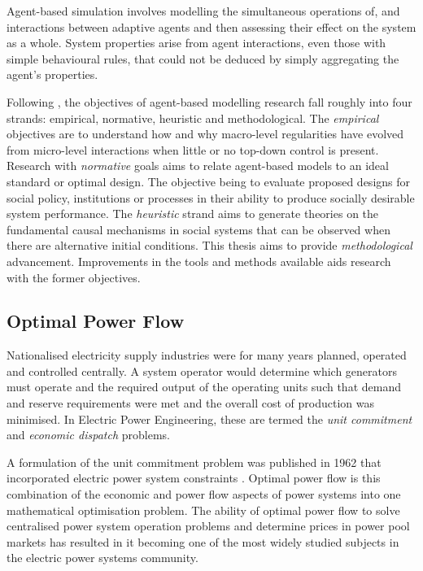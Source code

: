 Agent-based simulation involves modelling the simultaneous operations of, and
interactions between adaptive agents and then assessing their effect on the
system as a whole.  System properties arise from agent interactions, even those
with simple behavioural rules, that could not be deduced by simply aggregating
the agent's properties. %

Following , the objectives of agent-based modelling
research fall roughly into four strands: empirical, normative, heuristic and
methodological. The \textit{empirical} objectives are to understand how and why
macro-level regularities have evolved from micro-level interactions when little
or no top-down control is present.  Research with \textit{normative} goals aims
to relate agent-based models to an ideal standard or optimal design.  The
objective being to evaluate proposed designs for social policy, institutions or
processes in their ability to produce socially desirable system performance. The
\textit{heuristic} strand aims to generate theories on the fundamental causal
mechanisms in social systems that can be observed when there are alternative
initial conditions.  This thesis aims to provide \textit{methodological}
advancement.  Improvements in the tools and methods available aids research with
the former objectives.

\subsection{Optimal Power Flow}
\label{sec:opf}
Nationalised electricity supply industries were for many years planned, operated
and controlled centrally.  A system operator would determine which generators
must operate and the required output of the operating units such that demand and
reserve requirements were met and the overall cost of production was minimised.
In Electric Power Engineering, these are termed the \textit{unit commitment} and
\textit{economic dispatch} problems.

A formulation of the unit commitment problem was published in 1962 that
incorporated electric power system constraints \cite{carpentier:opf}.  Optimal
power flow is this combination of the economic and power flow aspects of power
systems into one mathematical optimisation problem.  The ability of optimal
power flow to solve centralised power system operation problems and determine
prices in power pool markets has resulted in it becoming one of the most widely
studied subjects in the electric power systems community.


